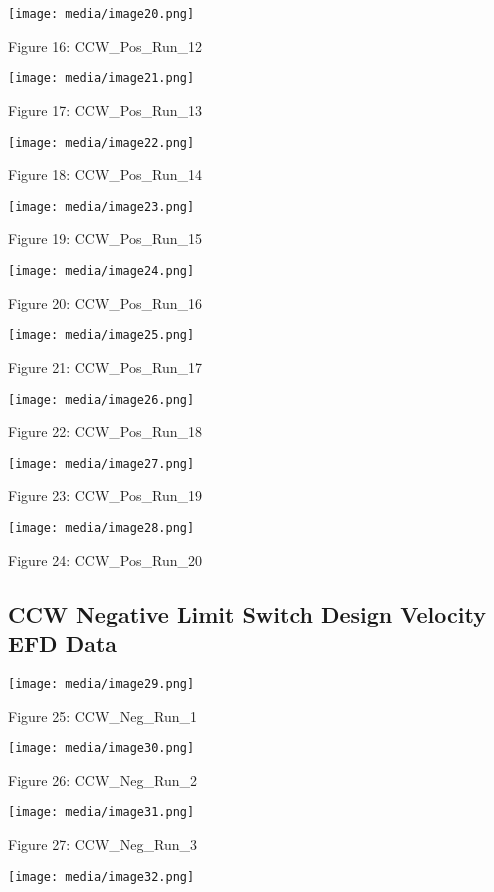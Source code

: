\documentclass[SE,lsstdraft,authoryear,toc]{lsstdoc}
\begin{document}
\texttt{[image: media/image20.png]}

Figure 16: CCW\_Pos\_Run\_12

\texttt{[image: media/image21.png]}

Figure 17: CCW\_Pos\_Run\_13

\texttt{[image: media/image22.png]}

Figure 18: CCW\_Pos\_Run\_14

\texttt{[image: media/image23.png]}

Figure 19: CCW\_Pos\_Run\_15

\texttt{[image: media/image24.png]}

Figure 20: CCW\_Pos\_Run\_16

\texttt{[image: media/image25.png]}

Figure 21: CCW\_Pos\_Run\_17

\texttt{[image: media/image26.png]}

Figure 22: CCW\_Pos\_Run\_18

\texttt{[image: media/image27.png]}

Figure 23: CCW\_Pos\_Run\_19

\texttt{[image: media/image28.png]}

Figure 24: CCW\_Pos\_Run\_20

\hypertarget{ccw-negative-limit-switch-design-velocity-efd-data}{%
\subsection{CCW Negative Limit Switch Design Velocity EFD
Data}\label{ccw-negative-limit-switch-design-velocity-efd-data}}

\texttt{[image: media/image29.png]}

Figure 25: CCW\_Neg\_Run\_1

\texttt{[image: media/image30.png]}

Figure 26: CCW\_Neg\_Run\_2

\texttt{[image: media/image31.png]}

Figure 27: CCW\_Neg\_Run\_3

\texttt{[image: media/image32.png]}
\end{document}
